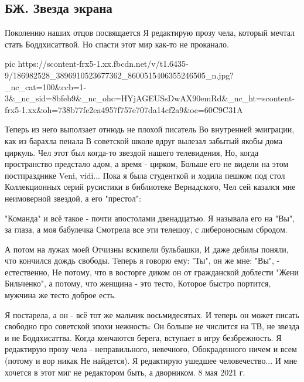  
 
 
 
 
\subsection{БЖ. Звезда экрана}

Поколению наших отцов посвящается
Я редактирую прозу чела, который мечтал стать Боддхисаттвой.
Но спасти этот мир как-то не проканало.

\ifcmt
  pic https://scontent-frx5-1.xx.fbcdn.net/v/t1.6435-9/186982528_3896910523677362_8600515406355246505_n.jpg?_nc_cat=100&ccb=1-3&_nc_sid=8bfeb9&_nc_ohc=HYjAGEUSsDwAX90emRd&_nc_ht=scontent-frx5-1.xx&oh=738b77fe2ea4957f757e707da14cf2a9&oe=60C9C31A
\fi

Теперь из него выползает отнюдь не плохой писатель
Во внутренней эмиграции, как из барахла пенала
В советской школе вдруг вылезал забытый якобы дома циркуль.
Чел этот был когда-то звездой нашего телевидения,
Но, когда пространство предстало адом, а время - цирком,
Больше его не видели на этом постпразднике Veni, vidi...
Пока я была студенткой и ходила пешком под стол
Коллекционных серий русистики в библиотеке Вернадского,
Чел сей казался мне неимоверной звездой, а его "престол":

"Команда" и всё такое - почти апостолами двенадцатью.
Я называла его на "Вы", за глаза, а моя бабулечка
Смотрела все эти телешоу, с либероносным сбродом.

А потом на лужах моей Отчизны вскипели бульбашки,
И даже дебилы поняли, что кончился дождь свободы.
Теперь я говорю ему: "Ты", он же мне: "Вы", - естественно,
Не потому, что в восторге диком он от гражданской доблести
"Жени Бильченко", а потому, что женщина - это тесто,
Которое быстро портится, мужчина же тесто доброе есть.

Я постарела, а он - всё тот же мальчик восьмидесятых.
И теперь он может писать свободно про советской эпохи нежность:
Он больше не числится на ТВ, не звезда и не Боддхисаттва.
Когда кончаются берега, вступает в игру безбрежность.
Я редактирую прозу чела - неправильного, невечного,
Обокраденного ничем и всем (потому и вор никак
Не найдется). Я редактирую ушедшее человечество...
И мне хочется в этот миг не редактором быть, а дворником.
8 мая 2021 г.
